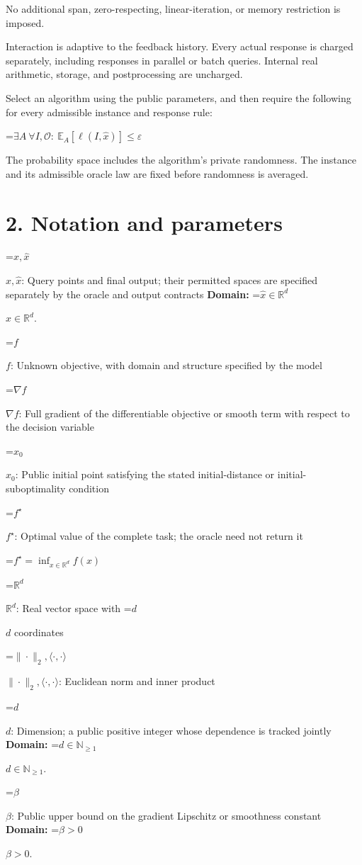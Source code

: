 \documentclass[10pt,a4paper]{article}
\newcommand{\AtlasMath}[1]{\par\begingroup\centering\setbox0=\hbox{$\displaystyle #1$}\ifdim\wd0>1.4\linewidth\typeout{ATLAS WIDE FORMULA: \the\wd0}\fi\ifdim\wd0>\linewidth\resizebox{\linewidth}{!}{\box0}\else\box0\fi\par\endgroup}
\newcommand{\AtlasInlineMath}[1]{\begingroup\setbox0=\hbox{$#1$}\ifdim\wd0>.4\linewidth\endgroup\AtlasMath{#1}\else\endgroup$#1$\fi}
\begin{document}
No additional span, zero-respecting, linear-iteration, or memory restriction is imposed.

Interaction is adaptive to the feedback history. Every actual response is charged separately, including responses in parallel or batch queries. Internal real arithmetic, storage, and postprocessing are uncharged.

Select an algorithm using the public parameters, and then require the following for every admissible instance and response rule:


\AtlasMath{\exists A\ \forall I,\mathcal{O}:\ \mathbb{E}_A[\ell(I,\widehat{x})]\le\varepsilon}


The probability space includes the algorithm's private randomness. The instance and its admissible oracle law are fixed before randomness is averaged.

\section{2. Notation and parameters}
\AtlasInlineMath{x,\widehat{x}}: Query points and final output; their permitted spaces are specified separately by the oracle and output contracts \textbf{Domain:} \AtlasInlineMath{\widehat{x}\in \mathbb{R}^d}.

\AtlasInlineMath{f}: Unknown objective, with domain and structure specified by the model

\AtlasInlineMath{\nabla f}: Full gradient of the differentiable objective or smooth term with respect to the decision variable

\AtlasInlineMath{x_0}: Public initial point satisfying the stated initial-distance or initial-suboptimality condition

\AtlasInlineMath{f^\star}: Optimal value of the complete task; the oracle need not return it


\AtlasMath{f^\star=\inf_{x\in \mathbb{R}^d}f(x)}


\AtlasInlineMath{\mathbb{R}^d}: Real vector space with \AtlasInlineMath{d} coordinates

\AtlasInlineMath{\|\cdot\|_2,\langle\cdot,\cdot\rangle}: Euclidean norm and inner product

\AtlasInlineMath{d}: Dimension; a public positive integer whose dependence is tracked jointly \textbf{Domain:} \AtlasInlineMath{d\in\mathbb{N}_{\ge1}}.

\AtlasInlineMath{\beta}: Public upper bound on the gradient Lipschitz or smoothness constant \textbf{Domain:} \AtlasInlineMath{\beta>0}.
\end{document}
